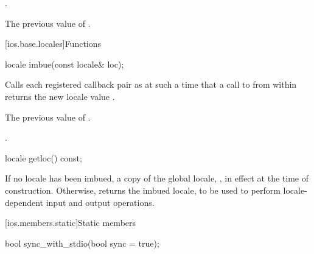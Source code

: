 \begin{itemdescr}
\pnum
\ensures
{}.

\pnum
\returns
The previous value of
.
\end{itemdescr}

[ios.base.locales]{Functions}

%
\begin{itemdecl}
locale imbue(const locale& loc);
\end{itemdecl}

\begin{itemdescr}
\pnum
\effects
Calls each registered callback pair
as
at such a time that a call to
from within
returns the new locale value
.

\pnum
\returns
The previous value of
.

\pnum
\ensures
{}.
\end{itemdescr}

%
\begin{itemdecl}
locale getloc() const;
\end{itemdecl}

\begin{itemdescr}
\pnum
\returns
If no locale has been imbued, a copy of the global \Cpp{} locale,
,
in effect at the time of construction.
Otherwise, returns the imbued locale, to be used to
perform locale-dependent input and output operations.
\end{itemdescr}

[ios.members.static]{Static members}

%
\begin{itemdecl}
bool sync_with_stdio(bool sync = true);
\end{itemdecl}

